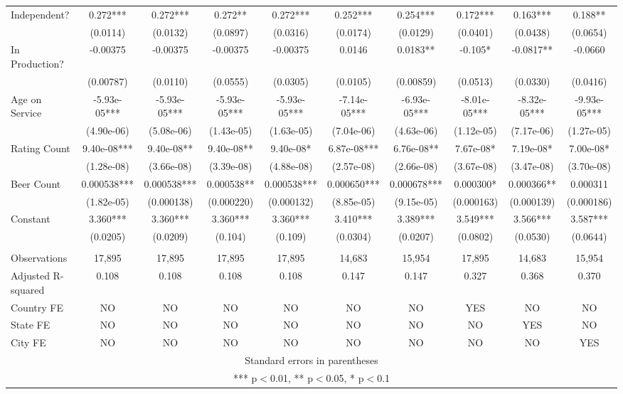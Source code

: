 \begin{tabular}{lccccccccc}
   Independent? & 0.272*** & 0.272*** & 0.272** & 0.272*** & 0.252*** & 0.254*** & 0.172*** & 0.163*** & 0.188** \\
    & (0.0114) & (0.0132) & (0.0897) & (0.0316) & (0.0174) & (0.0129) & (0.0401) & (0.0438) & (0.0654) \\
   In Production? & -0.00375 & -0.00375 & -0.00375 & -0.00375 & 0.0146 & 0.0183** & -0.105* & -0.0817** & -0.0660 \\
    & (0.00787) & (0.0110) & (0.0555) & (0.0305) & (0.0105) & (0.00859) & (0.0513) & (0.0330) & (0.0416) \\
   Age on Service & -5.93e-05*** & -5.93e-05*** & -5.93e-05*** & -5.93e-05*** & -7.14e-05*** & -6.93e-05*** & -8.01e-05*** & -8.32e-05*** & -9.93e-05*** \\
    & (4.90e-06) & (5.08e-06) & (1.43e-05) & (1.63e-05) & (7.04e-06) & (4.63e-06) & (1.12e-05) & (7.17e-06) & (1.27e-05) \\
   Rating Count & 9.40e-08*** & 9.40e-08** & 9.40e-08** & 9.40e-08* & 6.87e-08*** & 6.76e-08** & 7.67e-08* & 7.19e-08* & 7.00e-08* \\
    & (1.28e-08) & (3.66e-08) & (3.39e-08) & (4.88e-08) & (2.57e-08) & (2.66e-08) & (3.67e-08) & (3.47e-08) & (3.70e-08) \\
   Beer Count & 0.000538*** & 0.000538*** & 0.000538** & 0.000538*** & 0.000650*** & 0.000678*** & 0.000300* & 0.000366** & 0.000311 \\
    & (1.82e-05) & (0.000138) & (0.000220) & (0.000132) & (8.85e-05) & (9.15e-05) & (0.000163) & (0.000139) & (0.000186) \\
   Constant & 3.360*** & 3.360*** & 3.360*** & 3.360*** & 3.410*** & 3.389*** & 3.549*** & 3.566*** & 3.587*** \\
    & (0.0205) & (0.0209) & (0.104) & (0.109) & (0.0304) & (0.0207) & (0.0802) & (0.0530) & (0.0644) \\
    &  &  &  &  &  &  &  &  &  \\
   Observations & 17,895 & 17,895 & 17,895 & 17,895 & 14,683 & 15,954 & 17,895 & 14,683 & 15,954 \\
   Adjusted R-squared & 0.108 & 0.108 & 0.108 & 0.108 & 0.147 & 0.147 & 0.327 & 0.368 & 0.370 \\
   Country FE & NO & NO & NO & NO & NO & NO & YES & NO & NO \\
   State FE & NO & NO & NO & NO & NO & NO & NO & YES & NO \\
    City FE & NO & NO & NO & NO & NO & NO & NO & NO & YES \\ \hline
   \multicolumn{10}{c}{ Standard errors in parentheses} \\
   \multicolumn{10}{c}{ *** p$<$0.01, ** p$<$0.05, * p$<$0.1} \\
   \end{tabular}